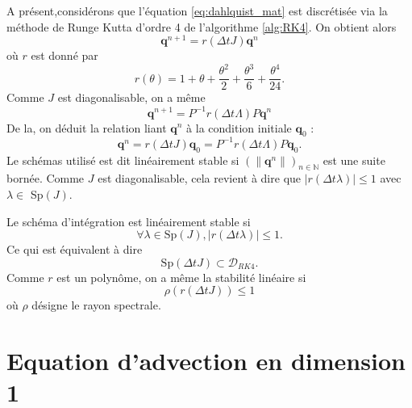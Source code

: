 A présent,considérons que l'équation \eqref{eq:dahlquist_mat} est discrétisée via la méthode de Runge Kutta d'ordre 4 de l'algorithme \ref{alg:RK4}. On obtient alors 
\begin{equation}
\mathbf{q}^{n+1} = r(\Delta t J) \mathbf{q}^n
\end{equation}
où $r$ est donné par 
\begin{equation}
r(\theta) = 1 + \theta + \dfrac{\theta^2}{2} + \dfrac{\theta^3}{6} + \dfrac{\theta^4}{24}.
\end{equation}
Comme $J$ est diagonalisable, on a même
\begin{equation}
\mathbf{q}^{n+1} = P^{-1}r(\Delta t \Lambda)P \mathbf{q}^n
\end{equation}
De la, on déduit la relation liant $\mathbf{q}^n$ à la condition initiale $\mathbf{q}_0$ : 
\begin{equation}
\mathbf{q}^n = r(\Delta t J) \mathbf{q}_0 = P^{-1}r(\Delta t \Lambda)P \mathbf{q}_0.
\end{equation}
Le schémas utilisé est dit linéairement stable si $\left( \| \mathbf{q}^n \| \right)_{n \in \mathbb{N}}$ est une suite bornée. Comme $J$ est diagonalisable, cela revient à dire que $| r(\Delta t \lambda) | \leq 1$ avec $\lambda \in $ Sp$(J)$.

\begin{proposition}
Le schéma d'intégration est linéairement stable si
\begin{equation}
\forall \lambda \in \text{Sp}(J), |r(\Delta t \lambda)| \leq 1.
\end{equation}
Ce qui est équivalent à dire
\begin{equation}
\text{Sp}(\Delta t J) \subset \mathcal{D}_{RK4}.
\end{equation}
Comme $r$ est un polynôme, on a même la stabilité linéaire si
\begin{equation}
\rho(r(\Delta t J)) \leq 1
\end{equation}
où $\rho$ désigne le rayon spectrale.
\label{prop:stab_rk4_mat}
\end{proposition}








\section{Equation d'advection en dimension 1}

